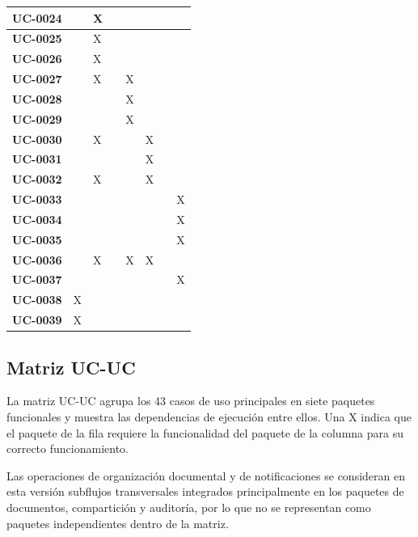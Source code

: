 \documentclass[11pt, a4paper]{article}
\begin{document}
{\begin{center}
{\begin{longtable}{|p{1.6cm}|p{1.55cm}|p{1.55cm}|p{1.55cm}|p{1.55cm}|p{1.55cm}|p{1.55cm}|p{1.55cm}|}
\hline
\textbf{UC-0024} &  & X &  &  &  &  &  \\
\hline
\textbf{UC-0025} &  & X &  &  &  &  &  \\
\hline
\textbf{UC-0026} &  & X &  &  &  &  &  \\
\hline
\textbf{UC-0027} &  & X &  & X &  &  &  \\
\hline
\textbf{UC-0028} &  &  &  & X &  &  &  \\
\hline
\textbf{UC-0029} &  &  &  & X &  &  &  \\
\hline
\textbf{UC-0030} &  & X &  &  & X &  &  \\
\hline
\textbf{UC-0031} &  &  &  &  & X &  &  \\
\hline
\textbf{UC-0032} &  & X &  &  & X &  &  \\
\hline
\textbf{UC-0033} &  &  &  &  &  &  & X \\
\hline
\textbf{UC-0034} &  &  &  &  &  &  & X \\
\hline
\textbf{UC-0035} &  &  &  &  &  &  & X \\
\hline
\textbf{UC-0036} &  & X &  & X & X &  &  \\
\hline
\textbf{UC-0037} &  &  &  &  &  &  & X \\
\hline
\textbf{UC-0038} & X &  &  &  &  &  &  \\
\hline
\textbf{UC-0039} & X &  &  &  &  &  &  \\
\hline
\end{longtable}
}
\end{center}

\subsection{Matriz UC-UC}

La matriz UC-UC agrupa los 43 casos de uso principales en siete paquetes funcionales y muestra las dependencias de ejecución entre ellos. Una X indica que el paquete de la fila requiere la funcionalidad del paquete de la columna para su correcto funcionamiento.

Las operaciones de organización documental y de notificaciones se consideran en esta versión subflujos transversales integrados principalmente en los paquetes de documentos, compartición y auditoría, por lo que no se representan como paquetes independientes dentro de la matriz.

}
\end{document}
